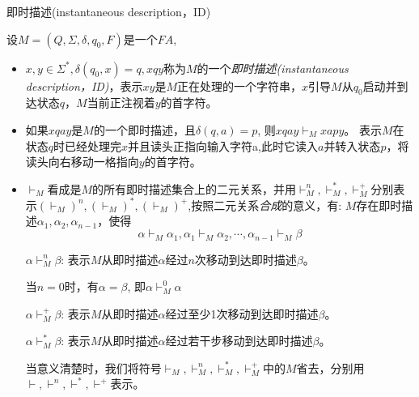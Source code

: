 \begin{definition} 即时描述(instantaneous description，ID)
	
	设$M=(Q,\Sigma,\delta,q_0,F)$是一个$FA$,
	\begin{itemize}
		\item $x,y\in \Sigma^{\ast}, \delta(q_0,x)=q, xqy$称为$M$的一个\emph{即时描述(instantaneous description，ID)}，表示$xy$是$M$正在处理的一个字符串，$x$引导$M$从$q_0$启动并到达状态$q$，$M$当前正注视着$y$的首字符。 
		
		\item 如果$xqay$是$M$的一个即时描述，且$\delta(q,a)=p$, 则$xqay\vdash_Mxapy$。
		\subitem 表示$M$在状态$q$时已经处理完$x$并且读头正指向输入字符a,此时它读入$a$并转入状态$p$，将读头向右移动一格指向$y$的首字符。
		
		\item $\vdash_{M}$看成是$M$的所有即时描述集合上的二元关系，并用$\vdash_M^{n},\vdash_M^{\ast},\vdash_M^{+}$分别表示$(\vdash_M)^{n},(\vdash_M)^{\ast},(\vdash_M)^{+}$,按照二元关系\emph{合成}的意义，有:
		\subitem $M$存在即时描述$\alpha_1,\alpha_2,\alpha_{n-1}$，使得
		\[\alpha\vdash_M\alpha_1,\alpha_1\vdash_M\alpha_2,\cdots,\alpha_{n-1}\vdash_M\beta\]
		
		\subitem $\alpha\vdash_M^n\beta$: 表示$M$从即时描述$\alpha$经过$n$次移动到达即时描述$\beta$。
		
		\subitem 当$n=0$时，有$\alpha=\beta$, 即$\alpha\vdash_M^0\alpha$
		
		\subitem $\alpha\vdash_M^+\beta$: 表示$M$从即时描述$\alpha$经过至少1次移动到达即时描述$\beta$。
		
		\subitem $\alpha\vdash_M^{\ast}\beta$: 表示$M$从即时描述$\alpha$经过若干步移动到达即时描述$\beta$。
		
		\subitem 当意义清楚时，我们将符号$\vdash_M, \vdash_M^n, \vdash_M^{\ast}, \vdash_M^+$中的$M$省去，分别用$\vdash, \vdash^n, \vdash^\ast, \vdash^+$表示。	
	\end{itemize}
\end{definition}
